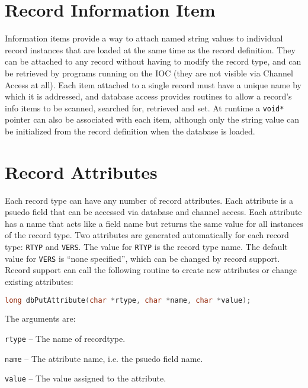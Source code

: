 \section{Record Information Item}
\label{Record Information Item}

Information items provide a way to attach named string values to individual record instances that are loaded at the same time as the record definition.
They can be attached to any record without having to modify the record type, and can be retrieved by programs running on the IOC (they are not visible via Channel Access at all).
Each item attached to a single record must have a unique name by which it is addressed, and database access provides routines to allow a record's info items to be scanned, searched for, retrieved and set.
At runtime a \verb|void*| pointer can also be associated with each item, although only the string value can be initialized from the record definition when the database is loaded.

\section{Record Attributes}

Each record type can have any number of record attributes.
Each attribute is a psuedo field that can be accessed via database and channel access.
Each attribute has a name that acts like a field name but returns the same value for all instances of the record type.
Two attributes are generated automatically for each record type: \verb|RTYP| and \verb|VERS|.
The value for \verb|RTYP| is the record type name.
The default value for \verb|VERS| is ``none specified'', which can be changed by record support.
Record support can call the following routine to create new attributes or change existing attributes:

\begin{lstlisting}[language=C]
long dbPutAttribute(char *rtype, char *name, char *value);
\end{lstlisting}

The arguments are:

\begin{description}
\item \verb|rtype| -- The name of recordtype.
\item \verb|name| -- The attribute name, i.e. the psuedo field name.
\item \verb|value| -- The value assigned to the attribute.
\end{description}

